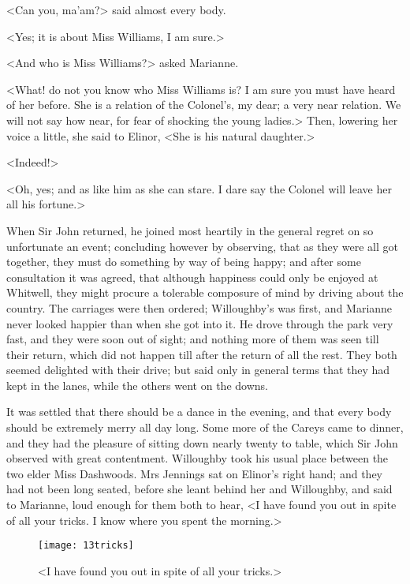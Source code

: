 <Can you, ma'am?> said almost every body.

<Yes; it is about Miss Williams, I am sure.>

<And who is Miss Williams?> asked Marianne.

<What! do not you know who Miss Williams is? I am sure you must have heard of her before. She is a relation of the Colonel's, my dear; a very near relation. We will not say how near, for fear of shocking the young ladies.> Then, lowering her voice a little, she said to Elinor, <She is his natural daughter.>

<Indeed!>

<Oh, yes; and as like him as she can stare. I dare say the Colonel will leave her all his fortune.>

When Sir John returned, he joined most heartily in the general regret on so unfortunate an event; concluding however by observing, that as they were all got together, they must do something by way of being happy; and after some consultation it was agreed, that although happiness could only be enjoyed at Whitwell, they might procure a tolerable composure of mind by driving about the country. The carriages were then ordered; Willoughby's was first, and Marianne never looked happier than when she got into it. He drove through the park very fast, and they were soon out of sight; and nothing more of them was seen till their return, which did not happen till after the return of all the rest. They both seemed delighted with their drive; but said only in general terms that they had kept in the lanes, while the others went on the downs.

It was settled that there should be a dance in the evening, and that every body should be extremely merry all day long. Some more of the Careys came to dinner, and they had the pleasure of sitting down nearly twenty to table, which Sir John observed with great contentment. Willoughby took his usual place between the two elder Miss Dashwoods. Mrs Jennings sat on Elinor's right hand; and they had not been long seated, before she leant behind her and Willoughby, and said to Marianne, loud enough for them both to hear, <I have found you out in spite of all your tricks. I know where you spent the morning.>

\begin{figure}[tbph]
\centering
\texttt{[image: 13tricks]}
\caption{<I have found you out in spite of all your tricks.>}
\end{figure}


